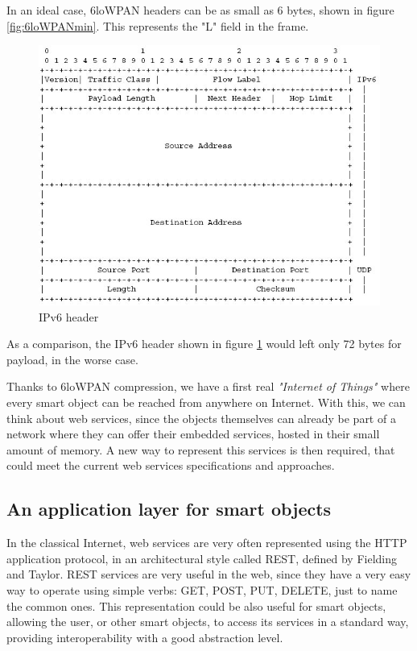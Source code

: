 In an ideal case, 6loWPAN headers can be as small as 6 bytes, shown in figure \ref{fig:6loWPANmin}.
This represents the "L" field in the frame.
\begin{figure}[htb]
	\centering
	\includegraphics[width=1\columnwidth]{chapters/background.images/ipv6Details.jpg}
	\caption{IPv6 header}
	\label{fig:IPv6Header}
\end{figure}
As a comparison, the IPv6 header shown in figure \ref{fig:IPv6Header} would left only 72 bytes for payload, in the worse case.

Thanks to 6loWPAN compression, we have a first real \textit{"Internet of Things"} where every smart object can be reached from anywhere on Internet.
With this, we can think about web services, since the objects themselves can already be part of a network where they can offer their embedded services, hosted in their small amount of memory.
A new way to represent this services is then required, that could meet the current web services specifications and approaches.

\subsection{An application layer for smart objects}
In the classical Internet, web services are very often represented using the HTTP application protocol\cite{rfc2616}, in an architectural style called REST, defined by Fielding and Taylor\cite{Fielding02REST}.
REST services are very useful in the web, since they have a very easy way to operate using simple verbs: GET, POST, PUT, DELETE, just to name the common ones.
This representation could be also useful for smart objects, allowing the user, or other smart objects, to access its services in a standard way, providing interoperability with a good abstraction level.

